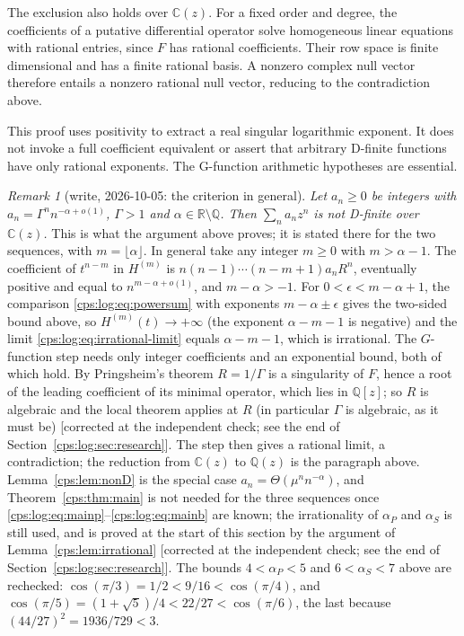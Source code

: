 \documentclass[11pt,letterpaper]{article}
\numberwithin{equation}{section}
\theoremstyle{remark}\newtheorem{remark}[theorem]{Remark}
\newcommand{\RR}{\mathbb R}
\newcommand{\ap}{\alpha_P}\newcommand{\as}{\alpha_S}
\begin{document}
The exclusion also holds over $\mathbb C(z)$. For a fixed order and degree,
the coefficients of a putative differential operator solve homogeneous
linear equations with rational entries, since $F$ has rational
coefficients. Their row space is finite dimensional and has a finite
rational basis. A nonzero complex null vector therefore entails a
nonzero rational null vector, reducing to the contradiction above.

This proof uses positivity to extract a real singular logarithmic
exponent. It does not invoke a full coefficient equivalent or assert
that arbitrary D-finite functions have only rational exponents.
The G-function arithmetic hypotheses are essential.

\begin{remark}[write, 2026-10-05: the criterion in general]\label{cps:log:rem:criterion}
\emph{Let $a_n\ge0$ be integers with $a_n=\Gamma^nn^{-\alpha+o(1)}$, $\Gamma>1$ and
$\alpha\in\RR\setminus\mathbb Q$. Then $\sum_na_nz^n$ is not D-finite over $\mathbb C(z)$.} This is what
the argument above proves; it is stated there for the two sequences, with $m=\lfloor\alpha\rfloor$.
In general take any integer $m\ge0$ with $m>\alpha-1$. The coefficient of $t^{n-m}$ in $H^{(m)}$ is
$n(n-1)\cdots(n-m+1)a_nR^{n}$, eventually positive and equal to $n^{m-\alpha+o(1)}$, and
$m-\alpha>-1$. For $0<\epsilon<m-\alpha+1$, the comparison \eqref{cps:log:eq:powersum} with
exponents $m-\alpha\pm\epsilon$ gives the two-sided bound above, so
$H^{(m)}(t)\to+\infty$ (the exponent $\alpha-m-1$ is negative) and the limit
\eqref{cps:log:eq:irrational-limit} equals $\alpha-m-1$, which is irrational. The $G$-function
step needs only integer coefficients and an exponential bound, both of which hold. By Pringsheim's
theorem $R=1/\Gamma$ is a singularity of $F$, hence a root of the leading coefficient of its
minimal operator, which lies in $\mathbb Q[z]$; so $R$ is algebraic and the local theorem applies
at $R$ (in particular $\Gamma$ is algebraic, as it must be) \textup{[}corrected at the independent check; see the end of
Section~\ref{cps:log:sec:research}\textup{]}.
The step then gives a rational limit, a contradiction; the reduction from $\mathbb C(z)$ to
$\mathbb Q(z)$ is the paragraph above. Lemma~\ref{cps:lem:nonD} is the special case $a_n=\Theta(\mu^nn^{-\alpha})$, and
Theorem~\ref{cps:thm:main} is not needed for the three sequences once
\eqref{cps:log:eq:mainp}--\eqref{cps:log:eq:mainb} are known; the irrationality of $\ap$ and $\as$ is
still used, and is proved at the start of this section by the argument of Lemma~\ref{cps:lem:irrational}
\textup{[}corrected at the independent check; see the end of
Section~\ref{cps:log:sec:research}\textup{]}. The bounds $4<\ap<5$ and
$6<\as<7$ above are rechecked: $\cos(\pi/3)=1/2<9/16<\cos(\pi/4)$, and
$\cos(\pi/5)=(1+\sqrt5)/4<22/27<\cos(\pi/6)$, the last because $(44/27)^2=1936/729<3$.
\end{remark}
\end{document}
